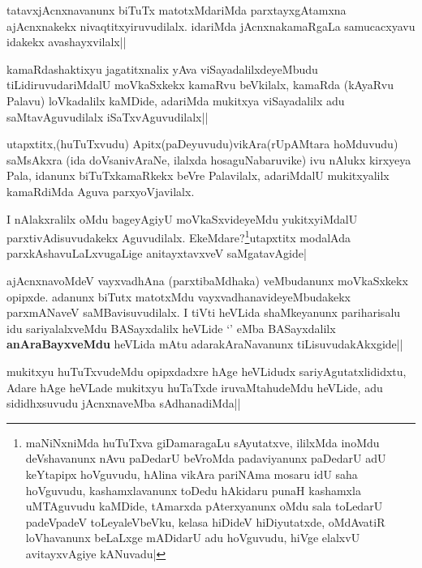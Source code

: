 \begin{artha}
tatavxjAcnxnavanunx biTuTx matotxMdariMda parxtayxgAtamxna ajAcnxnakekx nivaqtitxyiruvudilalx. idariMda jAcnxnakamaRgaLa samucacxyavu idakekx avashayxvilalx||
\end{artha}

\begin{artha}
kamaRdashaktixyu jagatitxnalix yAva viSayadalilxdeyeMbudu tiLidiruvudariMdalU moVkaSxkekx kamaRvu beVkilalx, kamaRda (kAyaRvu Palavu) loVkadalilx kaMDide, adariMda mukitxya viSayadalilx adu saMtavAguvudilalx iSaTxvAguvudilalx||
\end{artha}


\begin{artha}
utapxtitx,(huTuTxvudu) Apitx(paDeyuvudu)vikAra(rUpAMtara hoMduvudu) saMsAkxra (ida doVsanivAraNe, ilalxda hosaguNabaruvike) ivu nAlukx kirxyeya Pala, idanunx biTuTxkamaRkekx beVre Palavilalx, adariMdalU mukitxyalilx kamaRdiMda Aguva parxyoVjavilalx.
\end{artha}

\begin{artha}
I nAlakxralilx oMdu bageyAgiyU moVkaSxvideyeMdu yukitxyiMdalU parxtivAdisuvudakekx Aguvudilalx. EkeMdare?\footnote{maNiNxniMda huTuTxva giDamaragaLu sAyutatxve, ililxMda inoMdu deVshavanunx nAvu paDedarU beVroMda padaviyanunx paDedarU adU keYtapipx hoVguvudu, hAlina vikAra pariNAma mosaru idU saha hoVguvudu, kashamxlavanunx toDedu hAkidaru punaH kashamxla uMTAguvudu kaMDide, tAmarxda pAterxyanunx oMdu sala toLedarU padeVpadeV toLeyaleVbeVku, kelasa hiDideV hiDiyutatxde, oMdAvatiR loVhavanunx beLaLxge mADidarU adu hoVguvudu, hiVge elalxvU avitayxvAgiye kANuvadu|}utapxtitx modalAda parxkAshavuLaLxvugaLige anitayxtavxveV saMgatavAgide|
\end{artha}

\begin{artha}
ajAcnxnavoMdeV vayxvadhAna (parxtibaMdhaka) veMbudanunx moVkaSxkekx opipxde. adanunx biTutx matotxMdu vayxvadhanavideyeMbudakekx parxmANaveV saMBavisuvudilalx. I tiVti heVLida shaMkeyanunx pariharisalu idu sariyalalxveMdu BASayxdalilx heVLide `\stext' eMba BASayxdalilx \textbf{anAraBayxveMdu} heVLida mAtu adarakAraNavanunx tiLisuvudakAkxgide||
\end{artha}


\begin{artha}
mukitxyu huTuTxvudeMdu opipxdadxre hAge heVLidudx sariyAgutatxlididxtu, Adare hAge heVLade mukitxyu huTaTxde iruvaMtahudeMdu heVLide, adu sididhxsuvudu jAcnxnaveMba sAdhanadiMda||
\end{artha}

